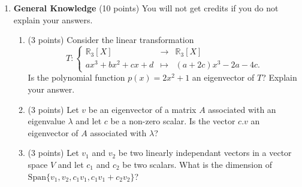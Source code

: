 \documentclass{article}
\begin{document}
\begin{enumerate}
\item \textbf{General Knowledge} (10 points) You will not get credits if you do not explain your answers.
\begin{enumerate}

\item (3 points) Consider the linear transformation 
\[T: \left\{\begin{array}{rcl}
{\mathbb R}_3 [X] & \rightarrow & {\mathbb R}_3 [X]\\
ax^3+bx^2+cx+d & \mapsto & (a+2c)x^3-2a-4c.
\end{array}\right.\] 
Is the polynomial function $p(x)=2x^2+1$ an eigenvector of $T$? Explain your answer. \\

\vspace{2.5cm}

\item (3 points) Let $v$ be an eigenvector of a matrix $A$ associated with an eigenvalue $\lambda$ and let $c$ be a non-zero scalar. Is the vector $c.v$ an eigenvector of $A$ associated with $\lambda$? \\

 \vspace{2.5cm}


\item (3 points) Let $v_1$ and $v_2$ be two linearly independant vectors in a vector space $V$ and let $c_1$ and $c_2$ be two scalars. What is the dimension of $\text{Span}\lbrace v_1,v_2, c_1 v_1,c_1 v_1+c_2 v_2 \rbrace$?
 \\

\vspace{2.4cm}



\end{enumerate}
\end{enumerate}
\end{document}
